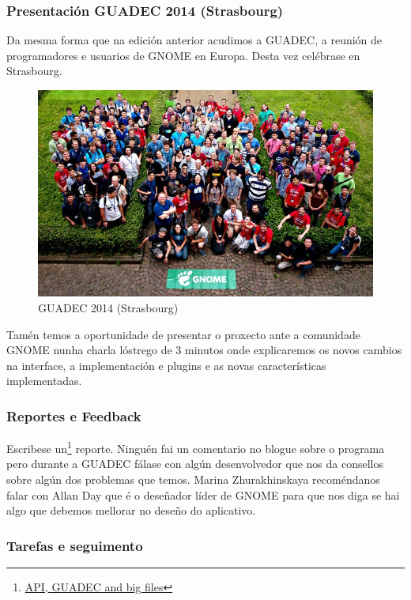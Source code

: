 \subsubsection{Presentación GUADEC 2014 (Strasbourg)}
Da mesma forma que na edición anterior acudimos a GUADEC, a reunión de programadores e usuarios de GNOME en Europa. Desta vez celébrase en Strasbourg.

\begin{figure}[h!]
    \centering
    \includegraphics[width=0.999\textwidth]{img/guadec_2014.jpg}
    \caption{GUADEC 2014 (Strasbourg)}
    \label{fig:guadec2012}
\end{figure}

Tamén temos a oportunidade de presentar o proxecto ante a comunidade GNOME nunha charla lóstrego de 3 minutos onde explicaremos os novos cambios na interface, a implementación e plugins e as novas características implementadas.

\subsubsection{Reportes e Feedback}

Escribese un\footnote{\href{http://aquelando.info/api-guadec-and-big-files/}{API, GUADEC and big files}} reporte. Ninguén fai un comentario no blogue sobre o programa pero durante a GUADEC fálase con algún desenvolvedor que nos da consellos sobre algún dos problemas que temos. Marina Zhurakhinskaya recoméndanos falar con Allan Day que é o deseñador líder de GNOME para que nos diga se hai algo que debemos mellorar no deseño do aplicativo.

\subsubsection{Tarefas e seguimento}

